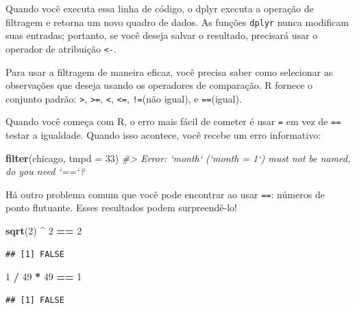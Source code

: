 \documentclass[a4paper]{book}
\newenvironment{Shaded}{\begin{snugshade}}{\end{snugshade}}
\newcommand{\CommentTok}[1]{\textcolor[rgb]{0.56,0.35,0.01}{\textit{#1}}}
\newcommand{\DataTypeTok}[1]{\textcolor[rgb]{0.13,0.29,0.53}{#1}}
\newcommand{\DecValTok}[1]{\textcolor[rgb]{0.00,0.00,0.81}{#1}}
\newcommand{\KeywordTok}[1]{\textcolor[rgb]{0.13,0.29,0.53}{\textbf{#1}}}
\newcommand{\NormalTok}[1]{#1}
\newcommand{\OperatorTok}[1]{\textcolor[rgb]{0.81,0.36,0.00}{\textbf{#1}}}
\newcommand{\StringTok}[1]{\textcolor[rgb]{0.31,0.60,0.02}{#1}}
\begin{document}
Quando você executa essa linha de código, o dplyr executa a operação de filtragem e retorna um novo quadro de dados. As funções \texttt{dplyr} nunca modificam suas entradas; portanto, se você deseja salvar o resultado, precisará usar o operador de atribuição \texttt{\textless{}-}.

Para usar a filtragem de maneira eficaz, você precisa saber como selecionar as observações que deseja usando os operadores de comparação. R fornece o conjunto padrão: \texttt{\textgreater{}}, \texttt{\textgreater{}=}, \texttt{\textless{}}, \texttt{\textless{}=}, \texttt{!=}(não igual), e \texttt{==}(igual).

Quando você começa com R, o erro mais fácil de cometer é usar \texttt{=} em vez de \texttt{==} testar a igualdade. Quando isso acontece, você recebe um erro informativo:

\begin{Shaded}
\begin{Highlighting}[]
\KeywordTok{filter}\NormalTok{(chicago, }\DataTypeTok{tmpd =} \DecValTok{33}\NormalTok{)}
\CommentTok{#> Error: `month` (`month = 1`) must not be named, do you need `==`?}
\end{Highlighting}
\end{Shaded}

Há outro problema comum que você pode encontrar ao usar \texttt{==}: números de ponto flutuante. Esses resultados podem surpreendê-lo!

\begin{Shaded}
\begin{Highlighting}[]
\KeywordTok{sqrt}\NormalTok{(}\DecValTok{2}\NormalTok{) }\OperatorTok{^}\StringTok{ }\DecValTok{2} \OperatorTok{==}\StringTok{ }\DecValTok{2}
\end{Highlighting}
\end{Shaded}

\begin{verbatim}
## [1] FALSE
\end{verbatim}

\begin{Shaded}
\begin{Highlighting}[]
\DecValTok{1} \OperatorTok{/}\StringTok{ }\DecValTok{49} \OperatorTok{*}\StringTok{ }\DecValTok{49} \OperatorTok{==}\StringTok{ }\DecValTok{1}
\end{Highlighting}
\end{Shaded}

\begin{verbatim}
## [1] FALSE
\end{verbatim}
\end{document}
